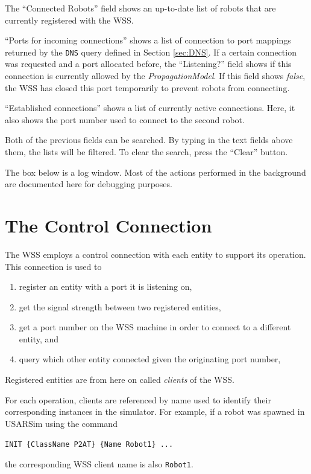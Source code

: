 \documentclass[11pt,a4paper]{article}
\begin{document}
The ``Connected Robots'' field shows an up-to-date list of robots that are currently registered with the WSS.

``Ports for incoming connections'' shows a list of connection to port mappings returned by the \texttt{DNS} query defined in Section \ref{sec:DNS}. If a certain connection was requested and a port allocated before, the ``Listening?'' field shows if this connection is currently allowed by the \emph{PropagationModel}. If this field shows \emph{false}, the WSS has closed this port temporarily to prevent robots from connecting.

``Established connections'' shows a list of currently active connections. Here, it also shows the port number used to connect to the second robot.

Both of the previous fields can be searched. By typing in the text fields above them, the lists will be filtered. To clear the search, press the ``Clear'' button.

The box below is a log window. Most of the actions performed in the background are documented here for debugging purposes.

\section{The Control Connection}

The WSS employs a control connection with each entity to support its operation. This connection is used to 
\begin{enumerate}
	\item register an entity with a port it is listening on,
	\item get the signal strength between two registered entities,
	\item get a port number on the WSS machine in order to connect to a different entity, and
	\item query which other entity connected given the originating port number,
\end{enumerate}

Registered entities are from here on called \emph{clients} of the WSS.

For each operation, clients are referenced by name used to identify their corresponding instances in the simulator. For example, if a robot was spawned in USARSim using the command

\texttt{INIT \{ClassName P2AT\} \{Name Robot1\} ... }

the corresponding WSS client name is also \texttt{Robot1}.
\end{document}
